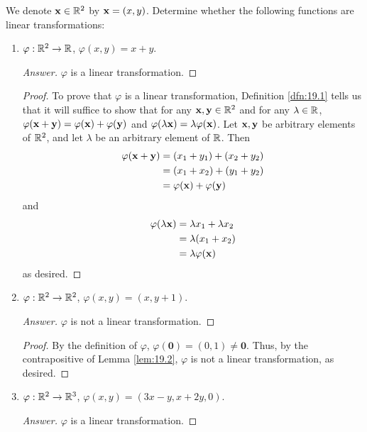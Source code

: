 \documentclass[../main.tex]{subfiles}
\begin{document}
\begin{exercise}\label{exr:19.3}
    We denote $\mathbf{x}\in\mathbb{R}^2$ by $\mathbf{x}=(x,y)$. Determine whether the following functions are linear transformations:
    \begin{enumerate}[label={(\alph*)}]
        \item $\varphi:\mathbb{R}^2\to\mathbb{R}$, $\varphi(x,y)=x+y$.
        \begin{proof}[Answer]
            $\varphi$ is a linear transformation.
        \end{proof}
        \begin{proof}
            To prove that $\varphi$ is a linear transformation, Definition \ref{dfn:19.1} tells us that it will suffice to show that for any $\mathbf{x},\mathbf{y}\in\mathbb{R}^2$ and for any $\lambda\in\mathbb{R}$, $\varphi(\mathbf{x}+\mathbf{y})=\varphi(\mathbf{x})+\varphi(\mathbf{y})$ and $\varphi(\lambda\mathbf{x})=\lambda\varphi(\mathbf{x})$. Let $\mathbf{x},\mathbf{y}$ be arbitrary elements of $\mathbb{R}^2$, and let $\lambda$ be an arbitrary element of $\mathbb{R}$. Then
            \begin{align*}
                \varphi(\mathbf{x}+\mathbf{y}) &= (x_1+y_1)+(x_2+y_2)\\
                &= (x_1+x_2)+(y_1+y_2)\\
                &= \varphi(\mathbf{x})+\varphi(\mathbf{y})
            \end{align*}
            and
            \begin{align*}
                \varphi(\lambda\mathbf{x}) &= \lambda x_1+\lambda x_2\\
                &= \lambda(x_1+x_2)\\
                &= \lambda\varphi(\mathbf{x})
            \end{align*}
            as desired.
        \end{proof}
        \item $\varphi:\mathbb{R}^2\to\mathbb{R}^2$, $\varphi(x,y)=(x,y+1)$.
        \begin{proof}[Answer]
            $\varphi$ is not a linear transformation.
        \end{proof}
        \begin{proof}
            By the definition of $\varphi$, $\varphi(\mathbf{0})=(0,1)\neq\mathbf{0}$. Thus, by the contrapositive of Lemma \ref{lem:19.2}, $\varphi$ is not a linear transformation, as desired.
        \end{proof}
        \item $\varphi:\mathbb{R}^2\to\mathbb{R}^3$, $\varphi(x,y)=(3x-y,x+2y,0)$.
        \begin{proof}[Answer]
            $\varphi$ is a linear transformation.

\end{proof}
\end{enumerate}
\end{exercise}
\end{document}
